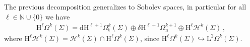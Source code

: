 

\begin{remark}
		The previous decomposition generalizes to Sobolev spaces, in particular for all $\ell\in\mathbb{N}\cup\{0\}$ we have
		\begin{align}\label{Eqn: Hodge decomposition for manifold with boundary for Sobolev spaces}
			\mathrm{H}^\ell\Omega^k(\Sigma)=\mathrm{d} \mathrm{H}^{\ell+1}\Omega^k_{\mathrm{t}}(\Sigma)\oplus\delta \mathrm{H}^{\ell+1}\Omega^{k+1}_{\mathrm{n}}\oplus
			\mathrm{H}^\ell \mathcal{H}^k(\Sigma)\,,		
		\end{align}
		where $\mathrm{H}^\ell \mathcal{H}^k(\Sigma)=\mathcal{H}^k(\Sigma)\cap\mathrm{H}^\ell\Omega^k(\Sigma)$, since $\mathrm{H}^\ell\Omega^k(\Sigma)\hookrightarrow\mathrm{L}^2\Omega^k(\Sigma)$.
\end{remark}


